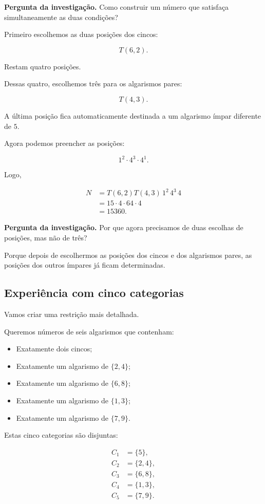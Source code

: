 \documentclass[11pt,a4paper,oneside]{book}
\newcommand{\Pergunta}[1]{\begin{perguntabox}\textbf{Pergunta da investigação.} #1\end{perguntabox}}
\begin{document}
\Pergunta{Como construir um número
que satisfaça simultaneamente
as duas condições?}

Primeiro escolhemos as duas
posições dos cincos:

\[
T(6,2).
\]

Restam quatro posições.

Dessas quatro, escolhemos três
para os algarismos pares:

\[
T(4,3).
\]

A última posição fica
automaticamente destinada
a um algarismo ímpar
diferente de $5$.

Agora podemos preencher
as posições:

\[
1^2\cdot4^3\cdot4^1.
\]

Logo,

\[
\begin{aligned}
N
&=T(6,2)T(4,3)\,1^2\,4^3\,4\\
&=15\cdot4\cdot64\cdot4\\
&=\boxed{15360}.
\end{aligned}
\]

\Pergunta{Por que agora precisamos
de duas escolhas de posições,
mas não de três?}

Porque depois de escolhermos
as posições dos cincos
e dos algarismos pares,
as posições dos outros ímpares
já ficam determinadas.

\subsection*{Experiência com cinco categorias}

Vamos criar uma restrição
mais detalhada.

Queremos números de seis algarismos
que contenham:

\begin{itemize}
\item Exatamente dois cincos;
\item Exatamente um algarismo de $\{2,4\}$;
\item Exatamente um algarismo de $\{6,8\}$;
\item Exatamente um algarismo de $\{1,3\}$;
\item Exatamente um algarismo de $\{7,9\}$.
\end{itemize}

Estas cinco categorias são disjuntas:

\[
\begin{aligned}
C_1&=\{5\},\\
C_2&=\{2,4\},\\
C_3&=\{6,8\},\\
C_4&=\{1,3\},\\
C_5&=\{7,9\}.
\end{aligned}
\]
\end{document}
